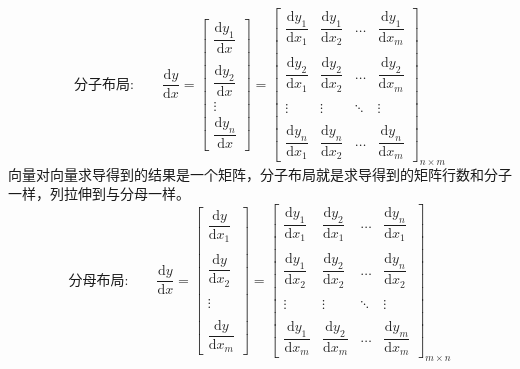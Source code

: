 \documentclass[withoutpreface,bwprint]{cumcmthesis} %
\begin{document}
	
	\begin{equation}
		\text{分子布局:} \quad \quad \dfrac{\mathrm{d} y}{\mathrm{d} x}=\left[
		\begin{array}{c}
			\dfrac{\mathrm{d} y_1}{\mathrm{d} x}\\\\
			\dfrac{\mathrm{d} y_2}{\mathrm{d} x}\\
			\vdots \\
			\dfrac{\mathrm{d} y_n}{\mathrm{d} x}
		\end{array}
		\right] =\left[
		\begin{array}{cccc}
			\dfrac{\mathrm{d} y_1}{\mathrm{d} x_1} & \dfrac{\mathrm{d} y_1}{\mathrm{d} x_2}&\ldots & \dfrac{\mathrm{d} y_1}{\mathrm{d} x_m}\\\\
			\dfrac{\mathrm{d} y_2}{\mathrm{d} x_1} & \dfrac{\mathrm{d} y_2}{\mathrm{d} x_2}&\ldots & \dfrac{\mathrm{d} y_2}{\mathrm{d} x_m}\\\\
			\vdots & \vdots & \ddots & \vdots \\\\
			\dfrac{\mathrm{d} y_n}{\mathrm{d} x_1} & \dfrac{\mathrm{d} y_n}{\mathrm{d} x_2}&\ldots & \dfrac{\mathrm{d} y_n}{\mathrm{d} x_m}
		\end{array}
		\right]_{n{\times}m} 
	\end{equation}
	向量对向量求导得到的结果是一个矩阵，分子布局就是求导得到的矩阵行数和分子一样，列拉伸到与分母一样。
	\begin{equation}
		\text{分母布局:} \quad \quad \dfrac{\mathrm{d} y}{\mathrm{d} x}=\left[
		\begin{array}{c}
			\dfrac{\mathrm{d} y}{\mathrm{d} x_1}\\\\
			\dfrac{\mathrm{d} y}{\mathrm{d} x_2}\\\\
			\vdots \\\\
			\dfrac{\mathrm{d} y}{\mathrm{d} x_m}
		\end{array}
		\right] =\left[
		\begin{array}{cccc}
			\dfrac{\mathrm{d} y_1}{\mathrm{d} x_1} & \dfrac{\mathrm{d} y_2}{\mathrm{d} x_1}&\ldots & \dfrac{\mathrm{d} y_n}{\mathrm{d} x_1}\\\\
			\dfrac{\mathrm{d} y_1}{\mathrm{d} x_2} & \dfrac{\mathrm{d} y_2}{\mathrm{d} x_2}&\ldots & \dfrac{\mathrm{d} y_n}{\mathrm{d} x_2}\\\\
			\vdots & \vdots & \ddots & \vdots \\\\
			\dfrac{\mathrm{d} y_1}{\mathrm{d} x_m} & \dfrac{\mathrm{d} y_2}{\mathrm{d} x_m}&\ldots & \dfrac{\mathrm{d} y_m}{\mathrm{d} x_m}
		\end{array}
		\right]_{m{\times}n}
	\end{equation} 
\end{document}
